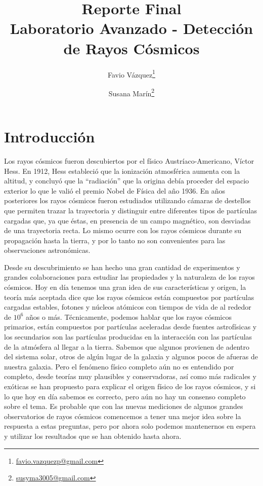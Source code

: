 \documentclass[a4paper,10pt]{article}
\title{{\huge Reporte Final} \\
\vspace{.2cm}
\large Laboratorio Avanzado - Detección de Rayos Cósmicos}
\author[1]{Favio Vázquez\footnote{\url{favio.vazquezp@gmail.com}}}
\author[2]{Susana Marín\footnote{\url{susyma3005@gmail.com}}}
\affil[1]{Instituto de Ciencias Nucleares,
Universidad Nacional Autónoma de México}
\affil[2]{Instituto de Química,
Universidad Nacional Autónoma de México}
\date{}
\numberwithin{equation}{section}
\begin{document}
\maketitle

\tableofcontents

\newpage

\section*{Introducción}

Los rayos cósmicos fueron descubiertos por el físico Austríaco-Americano, Víctor
Hess. En 1912, Hess estableció que la ionización atmosférica aumenta con la
altitud, y concluyó que la “radiación” que la origina debía proceder del espacio
exterior lo que le valió el premio Nobel de Física del año 1936. En años posteriores
los rayos cósmicos fueron estudiados utilizando cámaras de destellos que permiten 
trazar la trayectoria y distinguir entre diferentes tipos de partículas cargadas que,
ya que éstas, en presencia de un campo magnético, son desviadas de una trayectoria
recta. Lo mismo ocurre con los rayos cósmicos durante su propagación hasta la 
tierra, y por lo tanto no son convenientes para las observaciones astronómicas. 

\vspace{.3cm}

Desde su descubrimiento se han hecho una gran cantidad de experimentos y grandes 
colaboraciones para estudiar las propiedades y la naturaleza de los rayos cósmicos. 
Hoy en día tenemos una gran idea de sus características y origen, la teoría 
más aceptada dice que los rayos cósmicos están compuestos por partículas cargadas 
estables, fotones y núcleos atómicos con tiempos de vida de al rededor de 
$10^6$ años o más. Técnicamente, podemos hablar que los rayos cósmicos primarios, 
están compuestos por partículas aceleradas desde fuentes astrofísicas y los secundarios 
son las partículas producidas en la interacción con las partículas de la atmósfera 
al llegar a la tierra. Sabemos que algunos provienen de adentro del sistema solar, 
otros de algún lugar de la galaxia y algunos pocos de afueras de nuestra galaxia. Pero 
el fenómeno físico completo aún no es entendido por completo, desde teorías muy plausibles 
y conservadoras, así como más radicales y exóticas se han propuesto para explicar 
el origen físico de los rayos cósmicos, y si lo que hoy en día sabemos es correcto, pero 
aún no hay un consenso completo sobre el tema. Es probable que con las nuevas mediciones 
de algunos grandes observatorios de rayos cósmicos comencemos a tener una mejor idea 
sobre la respuesta a estas preguntas, pero por ahora solo podemos mantenernos en espera 
y utilizar los resultados que se han obtenido hasta ahora.
\end{document}
